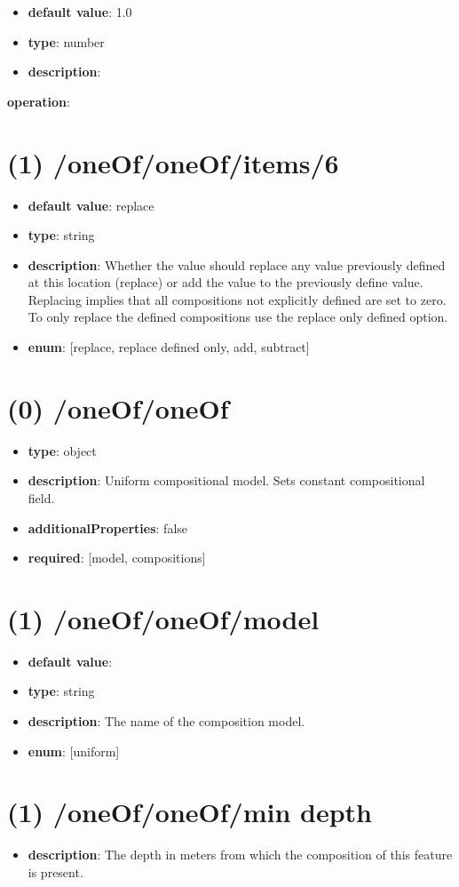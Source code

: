 \begin{itemize}[leftmargin=2em]\item {\bf default value}: 1.0
\item {\bf type}: number
\item {\bf description}: 
\end{itemize}\item {\bf operation}: \section{(1) /oneOf/oneOf/items/6}
\begin{itemize}[leftmargin=1em]\item {\bf default value}: replace
\item {\bf type}: string
\item {\bf description}: Whether the value should replace any value previously defined at this location (replace) or add the value to the previously define value. Replacing implies that all compositions not explicitly defined are set to zero. To only replace the defined compositions use the replace only defined option.
\item {\bf enum}: [replace, replace defined only, add, subtract]\end{itemize}\section{(0) /oneOf/oneOf}
\begin{itemize}[leftmargin=0em]\item {\bf type}: object
\item {\bf description}: Uniform compositional model. Sets constant compositional field.
\item {\bf additionalProperties}: false
\item {\bf required}: [model, compositions]\end{itemize}
\section{(1) /oneOf/oneOf/model}
\begin{itemize}[leftmargin=1em]\item {\bf default value}: 
\item {\bf type}: string
\item {\bf description}: The name of the composition model.
\item {\bf enum}: [uniform]\end{itemize}\section{(1) /oneOf/oneOf/min depth}
\begin{itemize}[leftmargin=1em]\item {\bf description}: The depth in meters from which the composition of this feature is present.
\end{itemize}
